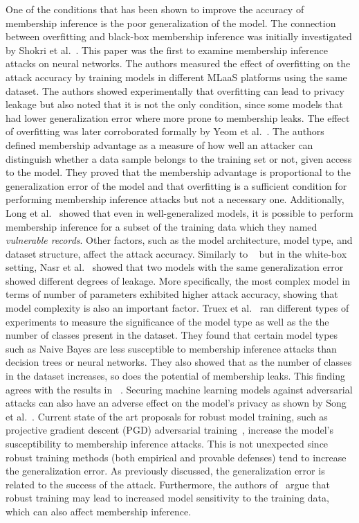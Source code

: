 One of the conditions that has been shown to improve the accuracy of membership inference is the poor generalization of the model. The connection between overfitting and black-box membership inference was initially investigated by Shokri et al.~. This paper was the first to examine membership inference attacks on neural networks. The authors measured the effect of overfitting on the attack accuracy by training models in different MLaaS platforms using the same dataset. The authors showed experimentally that overfitting can lead to privacy leakage but also noted that it is not the only condition, since some models that had lower generalization error where more prone to membership leaks. The effect of overfitting was later corroborated formally by Yeom et al.~. The authors defined membership advantage as a measure of how well an attacker can distinguish whether a data sample belongs to the training set or not, given access to the model. They proved that the membership advantage is proportional to the generalization error of the model and that overfitting is a sufficient condition for performing membership inference attacks but not a necessary one. Additionally, Long et al.~ showed that even in well-generalized models, it is possible to perform membership inference for a subset of the training data which they named \textit{vulnerable records}. 
Other factors, such as the model architecture, model type, and dataset structure, affect the attack accuracy. Similarly to ~ but in the white-box setting, Nasr et al.~ showed that two models with the same generalization error showed different degrees of leakage. More specifically, the most complex model in terms of number of parameters exhibited higher attack accuracy, showing that model complexity is also an important factor. 
Truex et al.~ ran different types of experiments to measure the significance of the model type as well as the the number of classes present in the dataset. They found that certain model types such as Naive Bayes are less susceptible to membership inference attacks than decision trees or neural networks. They also showed that as the number of classes in the dataset increases, so does the potential of membership leaks. This finding agrees with the results in ~.
Securing machine learning models against adversarial attacks can also have an adverse effect on the model's privacy as shown by Song et al.~. Current state of the art proposals for robust model training, such as projective gradient descent (PGD) adversarial training~, increase the model's susceptibility to membership inference attacks. This is not unexpected since robust training methods (both empirical and provable defenses) tend to increase the generalization error. As previously discussed, the generalization error is related to the success of the attack. Furthermore, the authors of~ argue that robust training may lead to increased model sensitivity to the training data, which can also affect membership inference.
